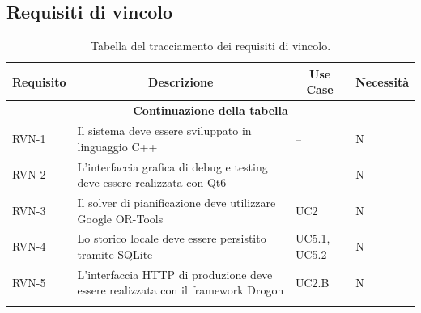\subsection{Requisiti di vincolo}
\begin{center}
\begin{longtable}{|p{2.1cm}|p{6.9cm}|p{2.0cm}|p{2.0cm}|}
\hline
\multicolumn{1}{|c|}{\textbf{Requisito}} &
\multicolumn{1}{c|}{\textbf{Descrizione}} &
\multicolumn{1}{c|}{\textbf{Use Case}} &
\multicolumn{1}{c|}{\textbf{Necessità}} \\
\hline
\endfirsthead
\hline
\multicolumn{4}{c}{{\bfseries Continuazione della tabella}}\\
\hline
\endhead

RVN-1 & Il sistema deve essere sviluppato in linguaggio C++ & -- & N \\
\hline
RVN-2 & L'interfaccia grafica di debug e testing deve essere realizzata con Qt6 & -- & N \\
\hline
RVN-3 & Il solver di pianificazione deve utilizzare Google OR-Tools & UC2 & N \\
\hline
RVN-4 & Lo storico locale deve essere persistito tramite SQLite & UC5.1, UC5.2 & N \\
\hline
RVN-5 & L'interfaccia HTTP di produzione deve essere realizzata con il framework Drogon & UC2.B & N \\
\hline
\caption{Tabella del tracciamento dei requisiti di vincolo.}
\label{tab:requisiti_vincolo}
\end{longtable}
\end{center}
